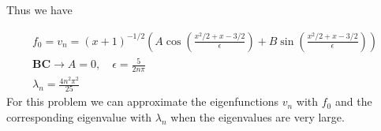 \documentclass{article}
\begin{document}
Thus we have 

\begin{gather*}
    f_0 = v_n = (x+1)^{-1/2}\left(A\cos\left(\frac{x^2/2 + x - 3/2}{\epsilon}\right) +
    B\sin\left(\frac{x^2/2 + x - 3/2}{\epsilon}\right)\right)\\
    \textbf{BC} \to A = 0, \quad \epsilon = \frac{5}{2n\pi}\\
    \lambda_n = \frac{4n^2\pi^2}{25}
\end{gather*}
For this problem we can approximate the eigenfunctions $v_n$ with $f_0$ and the
corresponding eigenvalue with $\lambda_n$ when the eigenvalues are very large. 
\end{document}
